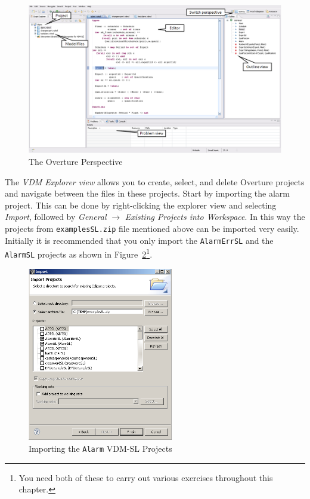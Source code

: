 \begin{figure}[tbh]
\begin{center}
  \includegraphics[width=5.5in]{figures/OverturePerspective}
  \caption[labelInTOC]{The Overture Perspective}
  \label{fig:OverturePerspective}
\end{center}
\end{figure}

The \emph{VDM Explorer view} allows you to create, select, and
delete Overture projects and navigate between the files in these
projects. Start by importing the alarm project. This can be done by
right-clicking the explorer view and selecting \emph{Import}, followed
by \emph{General} $\rightarrow$ \emph{Existing Projects into
  Workspace}.  In this way the projects from \texttt{examplesSL.zip} file
mentioned above can be imported very easily. Initially it is
recommended that you only import the \texttt{AlarmErrSL} and the
\texttt{AlarmSL} projects as shown in
Figure~\ref{fig:importalarm}\footnote{You need both of these to
  carry out various exercises throughout this chapter.}.

\begin{figure}[!htb]
\begin{center}
  \includegraphics[width=2.5in]{figures/importalarm}
  \caption[labelInTOC]{Importing the \texttt{Alarm} VDM-SL Projects}
  \label{fig:importalarm}
\end{center}
\end{figure}

